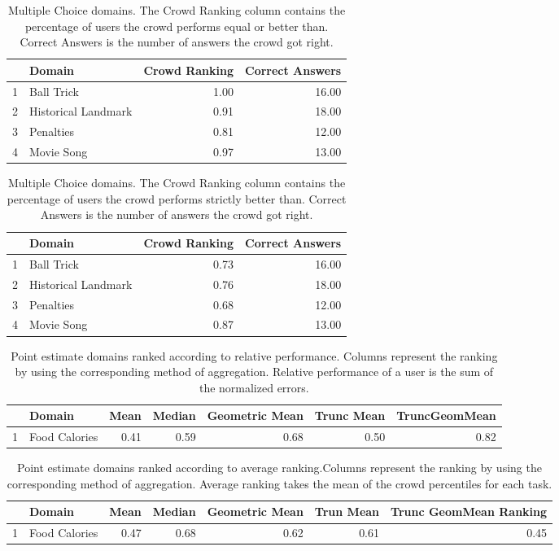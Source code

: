 \documentclass[12pt]{article}
\begin{document}
\begin{table}[ht]
\centering
\begin{tabular}{rlrr}
  \hline
 & Domain & Crowd Ranking & Correct Answers \\ 
  \hline
1 & Ball Trick & 1.00 & 16.00 \\ 
  2 & Historical Landmark & 0.91 & 18.00 \\ 
  3 & Penalties & 0.81 & 12.00 \\ 
  4 & Movie Song & 0.97 & 13.00 \\ 
   \hline
\end{tabular}
\caption{Multiple Choice domains. The Crowd Ranking column 
       contains the percentage of users the crowd performs equal or better than. Correct
       Answers is the number of answers the crowd got right.} 
\end{table}

\begin{table}[ht]
\centering
\begin{tabular}{rlrr}
  \hline
 & Domain & Crowd Ranking & Correct Answers \\ 
  \hline
1 & Ball Trick & 0.73 & 16.00 \\ 
  2 & Historical Landmark & 0.76 & 18.00 \\ 
  3 & Penalties & 0.68 & 12.00 \\ 
  4 & Movie Song & 0.87 & 13.00 \\ 
   \hline
\end{tabular}
\caption{Multiple Choice domains. The Crowd Ranking column 
       contains the percentage of users the crowd performs strictly better than. Correct
       Answers is the number of answers the crowd got right.} 
\end{table}

\begin{table}[ht]
\centering
\begin{tabular}{rlrrrrr}
  \hline
 & Domain & Mean  & Median  & Geometric Mean  & Trunc Mean  & TruncGeomMean  \\ 
  \hline
1 & Food Calories & 0.41 & 0.59 & 0.68 & 0.50 & 0.82 \\ 
   \hline
\end{tabular}
\caption{ Point estimate domains ranked according to relative performance.
       Columns represent the ranking by using the corresponding method of aggregation. Relative 
       performance of a user is the sum of the normalized errors.} 
\end{table}

\begin{table}[ht]
\centering
\begin{tabular}{rlrrrrr}
  \hline
 & Domain & Mean  & Median  & Geometric Mean  & Trun Mean  & Trunc GeomMean Ranking \\ 
  \hline
1 & Food Calories & 0.47 & 0.68 & 0.62 & 0.61 & 0.45 \\ 
   \hline
\end{tabular}
\caption{ Point estimate domains ranked according to average ranking.Columns represent the ranking by using the corresponding method of aggregation. Average ranking takes the mean of the crowd percentiles for each task.} 
\end{table}
\end{document}
